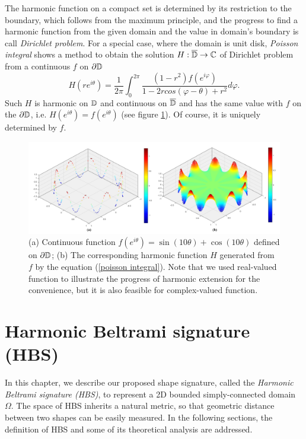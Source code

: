 \documentclass[review,onefignum,onetabnum]{siamonline190516}
\begin{document}
        The harmonic function on a compact set is determined by its restriction to the boundary, which follows from the maximum principle, and the progress to find a harmonic function from the given domain and the value in domain's boundary is call \textit{Dirichlet problem}. For a special case, where the domain is unit disk, \textit{Poisson integral} shows a method to obtain the solution $H : \overline{\mathbb{D}} \rightarrow \mathbb{C}$ of Dirichlet problem from a continuous $f$ on $\partial \mathbb{D}$
            \begin{equation}\label{poisson integral}
                H(re^{i\theta}) = \frac{1}{2\pi}\int_0^{2\pi} \frac{(1-r^2)f(e^{i \varphi})}{1 - 2 r cos (\varphi - \theta) + r^2} d\varphi.
            \end{equation}
        Such $H$ is harmonic on $\mathbb{D}$ and continuous on $\overline{\mathbb{D}}$ and has the same value with $f$ on the $\partial \mathbb{D}$, i.e. $H(e^{i\theta}) = f(e^{i\theta})$ (see figure \ref{harmonic}). Of course, it is uniquely determined by $f$.
        
        \begin{figure}
            \begin{center}
                \includegraphics[width=12cm]{fig4.png}
            \end{center}
            \caption{(a) Continuous function $f(e^{i \theta}) = \sin(10 \theta) + \cos(10 \theta)$ defined on $\partial \mathbb{D}$; (b) The corresponding harmonic function $H$ generated from $f$ by the equation (\ref{poisson integral}). Note that we used real-valued function to illustrate the progress of harmonic extension for the convenience, but it is also feasible for complex-valued function.}
            \label{harmonic}
        \end{figure}

\section{Harmonic Beltrami signature (HBS)}\label{main}
In this chapter, we describe our proposed shape signature, called the {\it Harmonic Beltrami signature (HBS)}, to represent a 2D bounded simply-connected domain $\Omega$. The space of HBS inherits a natural metric, so that geometric distance between two shapes can be easily measured. In the following sections, the definition of HBS and some of its theoretical analysis are addressed.
\end{document}
